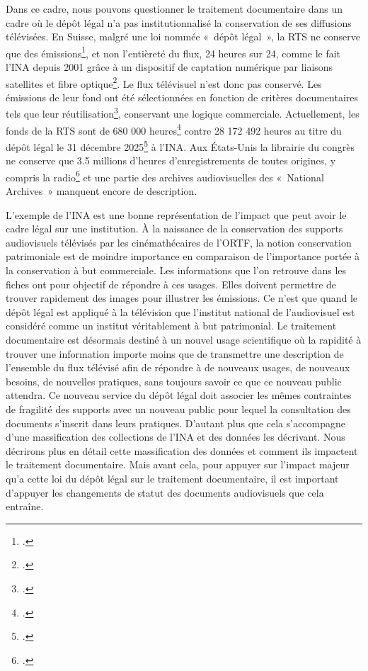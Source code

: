 Dans ce cadre, nous pouvons questionner le traitement documentaire dans un cadre où le dépôt légal n’a pas institutionnalisé la conservation de ses diffusions télévisées. En Suisse, malgré une loi nommée « dépôt légal », la RTS ne conserve que des émissions\footcite[][11]{griveau2024}, et non l’entièreté du flux, 24 heures sur 24, comme le fait l’INA depuis 2001 grâce à un dispositif de captation numérique par liaisons satellites et fibre optique\footcite[][23]{saby2013}. Le flux télévisuel n’est donc pas conservé. Les émissions de leur fond ont été sélectionnées en fonction de critères documentaires tels que leur réutilisation\footcite[][16]{griveau2024}, conservant une logique commerciale. Actuellement, les fonds de la RTS sont de 680 000 heures\footcite[][13]{griveau2024} contre 28 172 492 heures au titre du dépôt légal le 31 décembre 2025\footcite[]{zotero-item-655} à l'INA. Aux États-Unis la librairie du congrès ne conserve que 3.5 millions d’heures d’enregistrements de toutes origines, y compris la radio\footcite[]{zotero-item-654} et une partie des archives audiovisuelles des « National Archives » manquent encore de description.


L'exemple de l'INA est une bonne représentation de l'impact que peut avoir le cadre légal sur une institution. À la naissance de la conservation des supports audiovisuels télévisés par les cinémathécaires de l'ORTF, la notion conservation patrimoniale est de moindre importance en comparaison de l'importance portée à la conservation à but commerciale. Les informations que l'on retrouve dans les fiches ont pour objectif de répondre à ces usages. Elles doivent permettre de trouver rapidement des images pour illustrer les émissions. Ce n'est que quand le dépôt légal est appliqué à la télévision que l'institut national de l’audiovisuel est considéré comme un institut véritablement à but patrimonial. Le traitement documentaire est désormais destiné à un nouvel usage scientifique où la rapidité à trouver une information importe moins que de transmettre une description de l'ensemble du flux télévisé afin de répondre à de nouveaux usages, de nouveaux besoins, de nouvelles pratiques, sans toujours savoir ce que ce nouveau public attendra. Ce nouveau service du dépôt légal doit associer les mêmes contraintes de fragilité des supports avec un nouveau public pour lequel la consultation des documents s'inscrit dans leurs pratiques. D'autant plus que cela s'accompagne d'une massification des collections de l'INA et des données les décrivant. Nous décrirons plus en détail cette massification des données et comment ils impactent le traitement documentaire. Mais avant cela, pour appuyer sur l'impact majeur qu'a cette loi du dépôt légal sur le traitement documentaire, il est important d'appuyer les changements de statut des documents audiovisuels que cela entraîne.